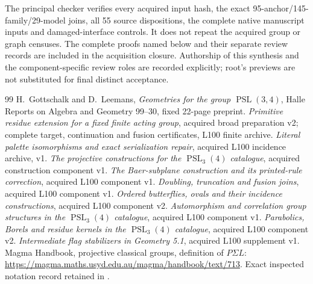 \documentclass[11pt]{article}
\newcommand{\PSL}{\operatorname{PSL}}\newcommand{\PG}{\operatorname{PG}}
\begin{document}
The principal checker verifies every acquired input hash, the exact
95-anchor/145-family/29-model joins, all 55 source dispositions,
the complete native manuscript inputs and damaged-interface
controls. It does not repeat the acquired group or graph censuses.
The complete proofs named below and their separate review records
are included in the acquisition closure. Authorship of this synthesis
and the component-specific review roles are recorded explicitly;
root's previews are not substituted for final distinct acceptance.

\begin{thebibliography}{99}
 H.~Gottschalk and D.~Leemans,
\emph{Geometries for the group $\PSL(3,4)$}, Halle Reports on
Algebra and Geometry 99--30, fixed 22-page preprint.
 \emph{Primitive residue extension for a fixed finite
acting group}, acquired broad preparation v2; complete target,
continuation and fusion certificates, L100 finite archive.
 \emph{Literal palette isomorphisms and exact
serialization repair}, acquired L100 incidence archive, v1.
 \emph{The projective constructions for the
$\PSL_3(4)$ catalogue}, acquired construction component v1.
 \emph{The Baer-subplane construction and its
printed-rule correction}, acquired L100 component v1.
 \emph{Doubling, truncation and fusion joins},
acquired L100 component v1.
 \emph{Ordered butterflies, ovals and their
incidence constructions}, acquired L100 component v2.
 \emph{Automorphism and correlation group
structures in the $\PSL_3(4)$ catalogue}, acquired L100 component v1.
 \emph{Parabolics, Borels and residue kernels
in the $\PSL_3(4)$ catalogue}, acquired L100 component v2.
 \emph{Intermediate flag stabilizers in Geometry 5.1},
acquired L100 supplement v1.
 Magma Handbook, projective classical groups,
definition of $P\Sigma L$: \url{https://magma.maths.usyd.edu.au/magma/handbook/text/713}.
Exact inspected notation record retained in \cite{Groups}.
\end{thebibliography}
\end{document}
